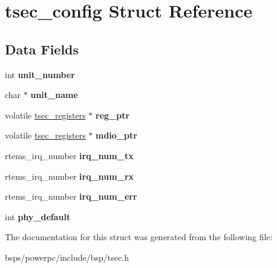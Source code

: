 \hypertarget{structtsec__config}{}\section{tsec\+\_\+config Struct Reference}
\label{structtsec__config}
\subsection*{Data Fields}
\begin{DoxyCompactItemize}
\item 
\mbox{\label{structtsec__config_a1912da7009170f50501eda2f07a60f37}} 
int {\bfseries unit\+\_\+number}
\item 
\mbox{\label{structtsec__config_abec2e1e80c274b9fd5b84db5f090eda3}} 
char $\ast$ {\bfseries unit\+\_\+name}
\item 
\mbox{\label{structtsec__config_a1396b1e03c717a9e5a66b4b42791ac7d}} 
volatile \mbox{\hyperlink{structtsec__registers}{tsec\+\_\+registers}} $\ast$ {\bfseries reg\+\_\+ptr}
\item 
\mbox{\label{structtsec__config_a854fe87564d4408335bc648b9e547ae4}} 
volatile \mbox{\hyperlink{structtsec__registers}{tsec\+\_\+registers}} $\ast$ {\bfseries mdio\+\_\+ptr}
\item 
\mbox{\label{structtsec__config_ae4224fc4998bd0855d827d413d565371}} 
rtems\+\_\+irq\+\_\+number {\bfseries irq\+\_\+num\+\_\+tx}
\item 
\mbox{\label{structtsec__config_abf4594bc00e2c8c219150228b144666a}} 
rtems\+\_\+irq\+\_\+number {\bfseries irq\+\_\+num\+\_\+rx}
\item 
\mbox{\label{structtsec__config_a7a5d4fa965416cab4a81c468fb41ef11}} 
rtems\+\_\+irq\+\_\+number {\bfseries irq\+\_\+num\+\_\+err}
\item 
\mbox{\label{structtsec__config_af3f4dd2e860377603156b02927d40d92}} 
int {\bfseries phy\+\_\+default}
\end{DoxyCompactItemize}


The documentation for this struct was generated from the following file\+:\begin{DoxyCompactItemize}
\item 
bsps/powerpc/include/bsp/tsec.\+h\end{DoxyCompactItemize}

